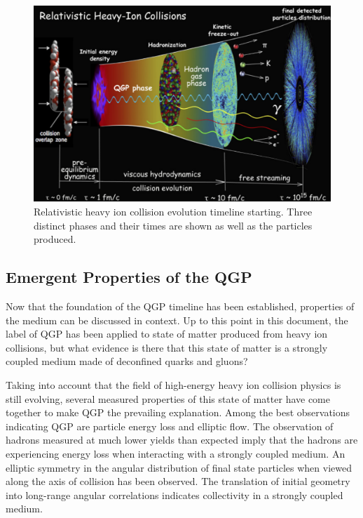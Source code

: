 \begin{figure}[!ht]
\begin{center}
\includegraphics[width=0.78\linewidth]{figs/qgp_evolution_timeline.png}
\caption{Relativistic heavy ion collision evolution timeline starting. Three distinct phases and their times are shown as well as the particles produced.}
\end{center}
\label{fig:qgp_timeline}
\end{figure}

\subsection{Emergent Properties of the QGP}
Now that the foundation of the QGP timeline has been established, properties of the medium can be discussed in context. Up to this point in this document, the label of QGP has been applied to state of matter produced from heavy ion collisions, but what evidence is there that this state of matter is a strongly coupled medium made of deconfined quarks and gluons?

Taking into account that the field of high-energy heavy ion collision physics is still evolving, several measured properties of this state of matter have come together to make QGP the prevailing explanation. Among the best observations indicating QGP are particle energy loss and elliptic flow. The observation of hadrons measured at much lower yields than expected imply that the hadrons are experiencing energy loss when interacting with a strongly coupled medium.  An elliptic symmetry in the angular distribution of final state particles when viewed along the axis of collision has been observed. The translation of initial geometry into long-range angular correlations indicates collectivity in a strongly coupled medium.


